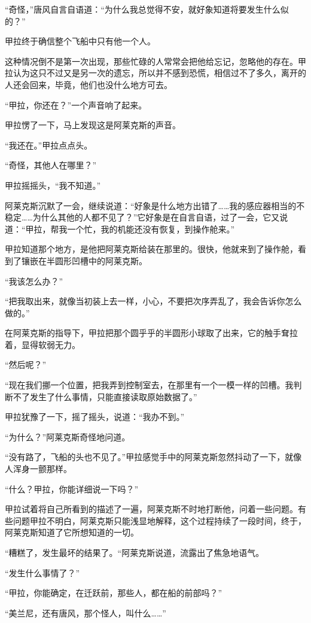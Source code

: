 “奇怪，”唐风自言自语道：“为什么我总觉得不安，就好象知道将要发生什么似的？” 

甲拉终于确信整个飞船中只有他一个人。 

这种情况倒不是第一次出现，那些忙碌的人常常会把他给忘记，忽略他的存在。甲拉认为这只不过又是另一次的遗忘，所以并不感到恐慌，相信过不了多久，离开的人还会回来，毕竟，他们也没什么地方可去。 

“甲拉，你还在？”一个声音响了起来。 

甲拉愣了一下，马上发现这是阿莱克斯的声音。 

“我还在。”甲拉点点头。 

“奇怪，其他人在哪里？” 

甲拉摇摇头，“我不知道。” 

阿莱克斯沉默了一会，继续说道：“好象是什么地方出错了……我的感应器相当的不稳定……为什么其他的人都不见了？”它好象是在自言自语，过了一会，它又说道：“甲拉，帮我一个忙，我的机能还没有恢复，到操作舱来。” 

甲拉知道那个地方，是他把阿莱克斯给装在那里的。很快，他就来到了操作舱，看到了镶嵌在半圆形凹槽中的阿莱克斯。 

“我该怎么办？” 

“把我取出来，就像当初装上去一样，小心，不要把次序弄乱了，我会告诉你怎么做的。” 

在阿莱克斯的指导下，甲拉把那个圆乎乎的半圆形小球取了出来，它的触手耷拉着，显得软弱无力。 

“然后呢？” 

“现在我们挪一个位置，把我弄到控制室去，在那里有一个一模一样的凹槽。我判断不了发生了什么事情，只能直接读取原始数据了。” 

甲拉犹豫了一下，摇了摇头，说道：“我办不到。” 

“为什么？”阿莱克斯奇怪地问道。 

“没有路了，飞船的头也不见了。”甲拉感觉手中的阿莱克斯忽然抖动了一下，就像人浑身一颤那样。 

“什么？甲拉，你能详细说一下吗？” 

甲拉试着将自己所看到的描述了一遍，阿莱克斯不时地打断他，问着一些问题。有些问题甲拉不明白，阿莱克斯只能浅显地解释，这个过程持续了一段时间，终于，阿莱克斯知道了它所想知道的一切。 

“糟糕了，发生最坏的结果了。“阿莱克斯说道，流露出了焦急地语气。 

“发生什么事情了？” 

“甲拉，你能确定，在迁跃前，那些人，都在船的前部吗？” 

“美兰尼，还有唐风，那个怪人，叫什么……” 

